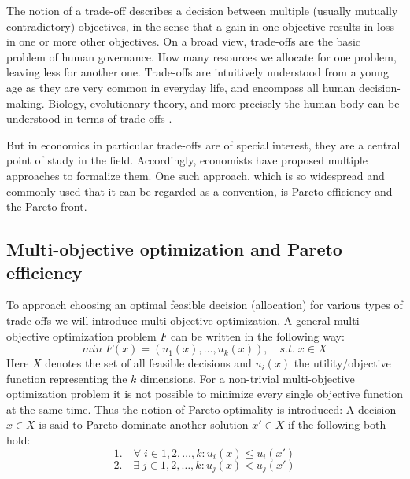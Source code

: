 

	The notion of a trade-off describes a decision between multiple (usually mutually contradictory) objectives, in the sense that a gain in one objective results in loss in one or more other objectives.
	On a broad view, trade-offs are the basic problem of human governance.
    How many resources we allocate for one problem, leaving less for another one.
	Trade-offs are intuitively understood from a young age as they are very common in everyday life, and encompass all human decision-making.
	Biology, evolutionary theory, and more precisely the human body can be understood in terms of trade-offs \cite{Launer2020}.

	But in economics in particular trade-offs are of special interest, they are a central point of study in the field.
	Accordingly, economists have proposed multiple approaches to formalize them.
	One such approach, which is so widespread and commonly used that it can be regarded as a convention, is Pareto efficiency and the Pareto front.

	\subsection{Multi-objective optimization and Pareto efficiency}

	To approach choosing an optimal feasible decision (allocation) for various types of trade-offs we will introduce multi-objective optimization.
	A general multi-objective optimization problem $F$ can be written in the following way:
	$$min \; F(x)=(u_1(x),\dots,u_k(x)), \quad s.t.\; x\in X$$
	Here $X$ denotes the set of all feasible decisions and $u_i(x)$ the utility/objective function representing the $k$ dimensions.
	For a non-trivial multi-objective optimization problem it is not possible to minimize every single objective function at the same time.
	Thus the notion of Pareto optimality is introduced:
	A decision $x\in X$ is said to Pareto dominate another solution $x'\in X$ if the following both hold:
	$$1.\quad \forall\; i\in {1,2,\dots,k}: u_i(x)\le u_i(x')$$
	$$2.\quad \exists\; j\in {1,2,\dots,k}: u_j(x) < u_j(x')$$

